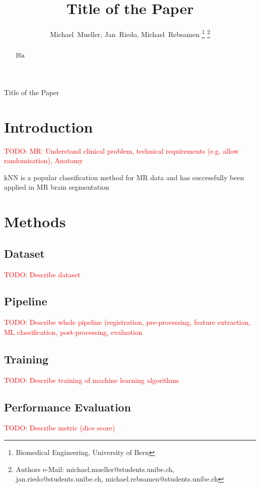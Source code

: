 \documentclass[journal]{IEEEtran}
\newcommand\TODO[1]{\textcolor{red}{TODO: #1}}
\begin{document}
\title{Title of the Paper}


\author{Michael~Mueller,
        Jan~Riedo,
        Michael~Rebsamen%
\thanks{Biomedical Engineering, University of Bern}%
\thanks{Authors e-Mail: michael.mueller@students.unibe.ch, jan.riedo@students.unibe.ch, michael.rebsamen@students.unibe.ch}}%
%
{Title of the Paper}
\maketitle

\begin{abstract}
Bla
\end{abstract}

\section{Introduction}
\TODO{MR: Understand clinical problem, technical requirements (e.g. allow randomisation), Anatomy}

kNN is a popular classification method for MR data and has successfully been applied in MR brain segmentation\cite{Anbeek2004,Cocosco2003,Warfield2000}


\section{Methods}

\subsection{Dataset}
\TODO{Describe dataset}

\subsection{Pipeline}
\TODO{Describe whole pipeline (registration, pre-processing, feature extraction, ML classification, post-processing, evaluation}

\subsection{Training}
\TODO{Describe training of machine learning algorithms}

\subsection{Performance Evaluation}
\TODO{Describe metric (dice score)}
\end{document}
